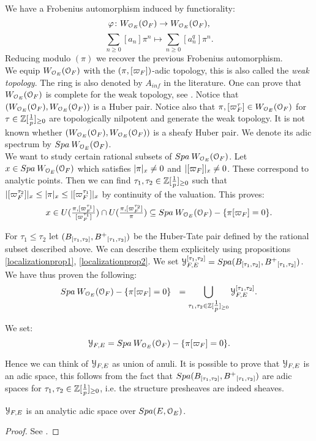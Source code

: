 We have a Frobenius automorphism induced by functiorality:
\[\varphi\colon  W_{\mathcal{O}_E}(\mathcal{O}_F)\to  W_{\mathcal{O}_E}(\mathcal{O}_F) ,\]
\[\sum_{n\geq0}[a_n]\pi^n\mapsto \sum_{n\geq0}[a_n^q]\pi^n.\]
Reducing modulo $(\pi)$ we recover the previous Frobenius automorphism.\\


We equip $W_{\mathcal{O}_E}(\mathcal{O}_F)$ with the $(\pi,[\varpi_F])$-adic topology, this is also called the \emph{weak topology}. 
The ring is also denoted by $A_{inf}$ in the literature. One can prove that $W_{\mathcal{O}_E}(\mathcal{O}_F)$ is complete for the
weak topology, see \cite[corollaire 1.4.15]{FF11}.
Notice that $(W_{\mathcal{O}_E}(\mathcal{O}_F), W_{\mathcal{O}_E}(\mathcal{O}_F))$ is a Huber pair.
Notice also that $\pi, [\varpi_F^\tau]\in W_{\mathcal{O}_E}(\mathcal{O}_F)$ for $\tau\in{\mathbb{Z}[\tfrac{1}{p}]_{\geq0}}$ are topologically nilpotent and generate the weak topology.
It is not known whether $(W_{\mathcal{O}_E}(\mathcal{O}_F), W_{\mathcal{O}_E}(\mathcal{O}_F))$ is a sheafy Huber pair. We denote its adic spectrum by ${Spa{\:W_{\mathcal{O}_E}(\mathcal{O}_F)}}$.\\

We want to study certain rational subsets of ${Spa{\:W_{\mathcal{O}_E}(\mathcal{O}_F)}}$.
Let $x\in{Spa{\:W_{\mathcal{O}_E}(\mathcal{O}_F)}}$ which satisfies $\lvert\pi\rvert_{x}\neq0$ and $\lvert[\varpi_F]\rvert_{x}\neq0$. These correspond to analytic points.
Then we can find  $\tau_{1}, \tau_{2}\in{\mathbb{Z}[\tfrac{1}{p}]_{\geq0}}$ such that
$\lvert[\varpi_F^{\tau_2}]\rvert_{x}\leq\lvert\pi\rvert_{x}\leq\lvert[\varpi_F^{\tau_1}]\rvert_{x}$ by continuity of the valuation.
This proves:
\[x\in U(\tfrac{\pi, [\varpi_F^{\tau_1}]}{[\varpi_F^{\tau_1}]})\cap U(\tfrac{\pi, [\varpi_F^{\tau_2}]}{\pi})\subseteq {Spa{\:W_{\mathcal{O}_E}(\mathcal{O}_F)}}-\{\pi[\varpi_F]=0\}.\]

For $\tau_1\leq\tau_2$ let $(B_{[\tau_1,\tau_2]}, B{^{+}}_{[\tau_1,\tau_2]})$ be the Huber-Tate pair defined by the rational subset described above.
We can describe them explicitely using propositions \ref{localizationprop1}, \ref{localizationprop2}. 
We set $\mathcal{Y}_{F,E}^{[\tau_1,\tau_2]} = {Spa({B_{[\tau_1,\tau_2]}},{B{^{+}}_{[\tau_1,\tau_2]}})}$.
We have thus proven the following:
\[{Spa{\:W_{\mathcal{O}_E}(\mathcal{O}_F)}}-\{\pi[\varpi_F]=0\} \:\:\:= \bigcup\limits_{\tau_{1}, \tau_{2}\in{\mathbb{Z}[\tfrac{1}{p}]_{\geq0}}}\mathcal{Y}_{F,E}^{[\tau_1,\tau_2]}.\]


We set:
\[\mathcal{Y}_{F,E} = {Spa{\:W_{\mathcal{O}_E}(\mathcal{O}_F)}}-\{\pi[\varpi_F]=0\}.\]

Hence we can think of $\mathcal{Y}_{F,E}$ as union of anuli.
It is possible to prove that $\mathcal{Y}_{F,E}$ is an adic space, this follows from the fact that ${Spa({B_{[\tau_1,\tau_2]}},{B{^{+}}_{[\tau_1,\tau_2]}})}$ are adic spaces for 
$\tau_{1}, \tau_{2}\in{\mathbb{Z}[\tfrac{1}{p}]_{\geq0}}$, i.e. the structure presheaves are indeed sheaves.
\begin{prop}
$\mathcal{Y}_{F,E}$ is an analytic adic space over ${Spa({E},{\mathcal{O}_E})}$.
\end{prop}
\begin{proof}
See \cite[proposition 13.1.1]{SW20}.
\end{proof}

